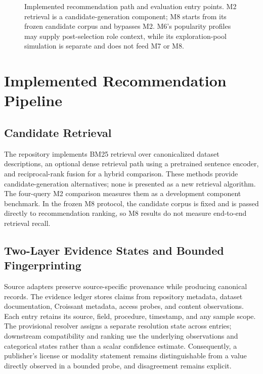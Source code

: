 \documentclass[conference]{IEEEtran}
\begin{document}
\begin{figure}[t]
\caption{Implemented recommendation path and evaluation entry points. M2 retrieval is a candidate-generation component; M8 starts from its frozen candidate corpus and bypasses M2. M6's popularity profiles may supply post-selection role context, while its exploration-pool simulation is separate and does not feed M7 or M8.}
\label{fig:implemented-pipeline}
\end{figure}

\section{Implemented Recommendation Pipeline}
\subsection{Candidate Retrieval}
The repository implements BM25 retrieval over canonicalized dataset descriptions, an optional dense retrieval path using a pretrained sentence encoder, and reciprocal-rank fusion for a hybrid comparison. These methods provide candidate-generation alternatives; none is presented as a new retrieval algorithm. The four-query M2 comparison measures them as a development component benchmark. In the frozen M8 protocol, the candidate corpus is fixed and is passed directly to recommendation ranking, so M8 results do not measure end-to-end retrieval recall.

\subsection{Two-Layer Evidence States and Bounded Fingerprinting}
Source adapters preserve source-specific provenance while producing canonical records. The evidence ledger stores claims from repository metadata, dataset documentation, Croissant metadata, access probes, and content observations. Each entry retains its source, field, procedure, timestamp, and any sample scope. The provisional resolver assigns a separate resolution state across entries; downstream compatibility and ranking use the underlying observations and categorical states rather than a scalar confidence estimate. Consequently, a publisher's license or modality statement remains distinguishable from a value directly observed in a bounded probe, and disagreement remains explicit.
\end{document}
